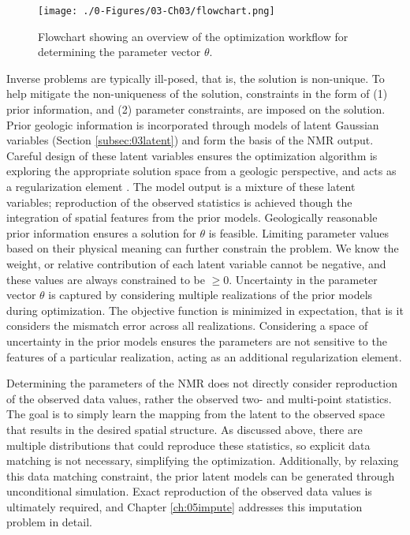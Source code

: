 \begin{figure}[htb!]
    \centering
    \texttt{[image: ./0-Figures/03-Ch03/flowchart.png]}
    \caption{Flowchart showing an overview of the optimization workflow for determining the parameter vector $\theta$.}
    \label{fig:flowchart}
\end{figure}

Inverse problems are typically ill-posed, that is, the solution is non-unique. To help mitigate the non-uniqueness of the solution, constraints in the form of (1) prior information, and (2) parameter constraints, are imposed on the solution. Prior geologic information is incorporated through models of latent Gaussian variables (Section \ref{subsec:03latent}) and form the basis of the \gls{NMR} output. Careful design of these latent variables ensures the optimization algorithm is exploring the appropriate solution space from a geologic perspective, and acts as a regularization element \citep{zhou2014inverse}. The model output is a mixture of these latent variables; reproduction of the observed statistics is achieved though the integration of spatial features from the prior models. Geologically reasonable prior information ensures a solution for $\theta$ is feasible. Limiting parameter values based on their physical meaning can further constrain the problem. We know the weight, or relative contribution of each latent variable cannot be negative, and these values are always constrained to be $\geq 0$. Uncertainty in the parameter vector $\theta$ is captured by considering multiple realizations of the prior models during optimization. The objective function is minimized in expectation, that is it considers the mismatch error across all realizations. Considering a space of uncertainty in the prior models ensures the parameters are not sensitive to the features of a particular realization, acting as an additional regularization element.

Determining the parameters of the \gls{NMR} does not directly consider reproduction of the observed data values, rather the observed two- and multi-point statistics. The goal is to simply learn the mapping from the latent to the observed space that results in the desired spatial structure. As discussed above, there are multiple distributions that could reproduce these statistics, so explicit data matching is not necessary, simplifying the optimization. Additionally, by relaxing this data matching constraint, the prior latent models can be generated through unconditional simulation. Exact reproduction of the observed data values is ultimately required, and Chapter \ref{ch:05impute} addresses this imputation problem in detail.


